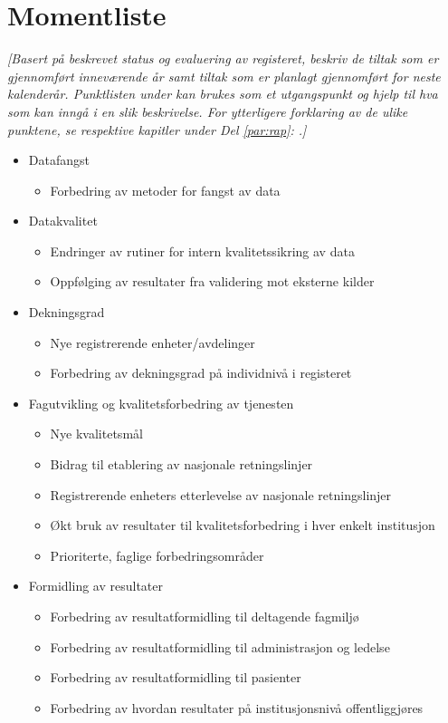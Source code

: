 \documentclass[norsk, a4paper, twocolumn]{report}
\newcommand{\guide}[1] {
	\textit{[\textcolor{guidegray}{#1}]}
	}
\begin{document}
\chapter{Momentliste}
\guide{Basert på beskrevet status og evaluering av registeret, beskriv de
tiltak som er gjennomført inneværende år samt tiltak som er planlagt gjennomført  for neste kalenderår.
Punktlisten under kan brukes som et utgangspunkt og hjelp til hva som kan
inngå i en slik beskrivelse. For ytterligere forklaring av de ulike punktene,
se respektive kapitler under Del \ref{par:rap}: \nameref{par:rap}.}

\begin{itemize}
  \item Datafangst
    \begin{itemize}
      \item Forbedring av metoder for fangst av data
    \end{itemize}
  \item Datakvalitet
    \begin{itemize}
      \item Endringer av rutiner for intern kvalitetssikring av data
      \item Oppfølging av resultater fra validering mot eksterne kilder
    \end{itemize}

  \item Dekningsgrad
    \begin{itemize}
      \item Nye registrerende enheter/avdelinger
      \item Forbedring av dekningsgrad på individnivå i registeret
    \end{itemize}
  \item Fagutvikling og kvalitetsforbedring av tjenesten
    \begin{itemize}
      \item Nye kvalitetsmål
      \item Bidrag til etablering av nasjonale retningslinjer
      \item Registrerende enheters etterlevelse av nasjonale retningslinjer
      \item Økt bruk av resultater til kvalitetsforbedring i hver enkelt institusjon
      \item Prioriterte, faglige forbedringsområder
    \end{itemize}
  \item Formidling av resultater
    \begin{itemize}
      \item Forbedring av resultatformidling til deltagende fagmiljø
      \item Forbedring av resultatformidling til administrasjon og ledelse
      \item Forbedring av resultatformidling til pasienter
      \item Forbedring av hvordan resultater på institusjonsnivå offentliggjøres
    \end{itemize}


\end{itemize}
\end{document}
